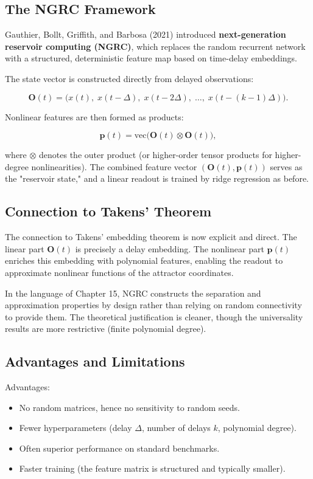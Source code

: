 \subsection{The NGRC Framework}\label{sec:17.5.1}

Gauthier, Bollt, Griffith, and Barbosa (2021) introduced \textbf{next-generation reservoir computing (NGRC)}, which replaces the random recurrent network with a structured, deterministic feature map based on time-delay embeddings.

The state vector is constructed directly from delayed observations:

\[
\mathbf{O}(t) = \big(x(t),\; x(t - \Delta),\; x(t - 2\Delta),\; \ldots,\; x(t - (k-1)\Delta)\big).
\]

Nonlinear features are then formed as products:

\[
\mathbf{p}(t) = \text{vec}\big(\mathbf{O}(t) \otimes \mathbf{O}(t)\big),
\]

where $\otimes$ denotes the outer product (or higher-order tensor products for higher-degree nonlinearities). The combined feature vector $(\mathbf{O}(t), \mathbf{p}(t))$ serves as the "reservoir state," and a linear readout is trained by ridge regression as before.

\subsection{Connection to Takens' Theorem}\label{sec:17.5.2}

The connection to Takens' embedding theorem is now explicit and direct. The linear part $\mathbf{O}(t)$ is precisely a delay embedding. The nonlinear part $\mathbf{p}(t)$ enriches this embedding with polynomial features, enabling the readout to approximate nonlinear functions of the attractor coordinates.

In the language of Chapter 15, NGRC constructs the separation and approximation properties by design rather than relying on random connectivity to provide them. The theoretical justification is cleaner, though the universality results are more restrictive (finite polynomial degree).

\subsection{Advantages and Limitations}\label{sec:17.5.3}

Advantages:
\begin{itemize}[nosep]
  \item No random matrices, hence no sensitivity to random seeds.
  \item Fewer hyperparameters (delay $\Delta$, number of delays $k$, polynomial degree).
  \item Often superior performance on standard benchmarks.
  \item Faster training (the feature matrix is structured and typically smaller).
\end{itemize}

